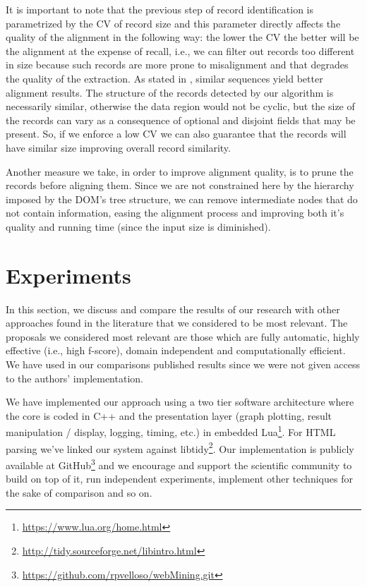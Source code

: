 \vspace{-0.3cm}

It is important to note that the previous step of record identification
is parametrized by the CV of record size and this parameter directly affects the
quality of the alignment in the following way: the lower the CV the better will
be the alignment at the expense of recall, i.e., we can filter out records too
different in size because such records are more prone to misalignment and that
degrades the quality of the extraction. As stated in \cite{centerstar1993}, 
similar sequences yield better alignment results. The structure of the
records detected by our algorithm is necessarily similar, otherwise the
data region would not be cyclic, but the size of the records can vary as a
consequence of optional and disjoint fields that may be present.
So, if we enforce a low CV we can also guarantee that the records will have
similar size improving overall record similarity.

Another measure we take, in order to improve alignment quality, is to prune the
records before aligning them. Since we are not constrained here by the hierarchy
imposed by the DOM's tree structure, we can remove intermediate nodes that do
not contain information, easing the alignment process and improving both it's
quality and running time (since the input size is diminished).

\section{Experiments}\label{sec:result}

In this section, we discuss and compare the results of our research with other
approaches found in the literature that we considered to be most relevant. The
proposals we considered most relevant are those which are fully automatic,
highly effective (i.e., high f-score), domain independent and computationally
efficient. We have used in our comparisons published results since we were not
given access to the authors' implementation.

We have implemented our approach using a two tier software architecture where
the core is coded in C++ and the presentation layer (graph plotting, result
manipulation / display, logging, timing, etc.) in embedded
Lua\footnote{\url{https://www.lua.org/home.html}}.
For HTML parsing we've linked our system against
libtidy\footnote{\url{http://tidy.sourceforge.net/libintro.html}}. Our
implementation is publicly available at GitHub\footnote{
\url{https://github.com/rpvelloso/webMining.git}} and we encourage and support
the scientific community to build on top of it, run independent experiments,
implement other techniques for the sake of comparison and so on.

